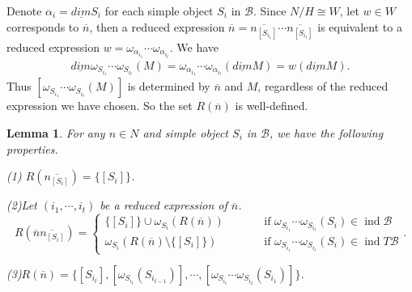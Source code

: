 \documentclass[12pt]{amsart}
\newtheorem{lemma}[theorem]{Lemma}
\begin{document}
Denote $\alpha_i = \underline{dim} S_i$ for each simple object $S_i$ in $\mathcal{B}$.
Since $N/H\cong W$, let $w\in W$ corresponds to $\overline{n}$, then a reduced expression $\overline{n} = \overline{n_{[S_{i_1}]}} \cdots \overline{n_{[S_{i_t}]}}$ is equivalent to a reduced expression $w=\omega_{\alpha_{i_1}}\cdots \omega_{\alpha_{i_t}}$.
We have 
\begin{align*}
    \underline{dim} \omega_{S_{i_1}} \cdots \omega_{S_{i_t}}(M) = \omega_{\alpha_{i_1}}\cdots \omega_{\alpha_{i_t}}(\underline{dim}M) = w(\underline{dim}M).
\end{align*}
Thus $[\omega_{S_{i_1}} \cdots \omega_{S_{i_t}}(M)]$ is determined by $\overline{n}$ and $M$, regardless of the reduced expression we have chosen. 
So the set $R(\overline{n})$ is well-defined.

\begin{lemma}\label{Rn}\cite[Lemma 8.3.2(i)]{Springer}
    For any $n\in N$ and simple object $S_i$ in $\mathcal{B}$, we have the following properties.

    (1) $R(\overline{n_{[S_i]}}) = \{ [S_i] \}$.

    (2)Let  $(i_1,\cdots,i_t)$ be a reduced expression of $\overline{n}$.
     \begin{equation*}
        R(\overline{n}\overline{n_{[S_i]}}) = 
        \begin{cases}
            \{ [S_i] \} \cup \omega_{S_i}(R(\overline{n}))   \qquad &\text{ if } \omega_{S_{i_1}} \cdots \omega_{S_{i_t}}(S_i) \in \operatorname{ind}\mathcal{B} \\
            \omega_{S_i}(R(\overline{n})\setminus \{[S_i]\})  \qquad \quad &\text{ if } \omega_{S_{i_1}} \cdots \omega_{S_{i_t}}(S_i) \in \operatorname{ind}T\mathcal{B}
        \end{cases}
        .
    \end{equation*}

    (3)$R(\overline{n}) = \{ [S_{i_t}], [\omega_{S_{i_t}}(S_{i_{t-1}})], \cdots,[\omega_{S_{i_t}} \cdots \omega_{S_{i_2}}(S_{i_1})]   \}$.
\end{lemma}
\end{document}
